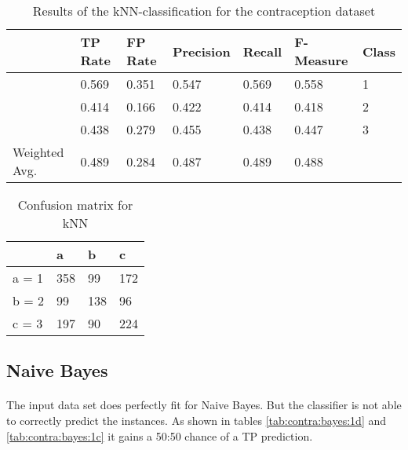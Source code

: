 \documentclass[paper=a4, fontsize=11pt]{scrartcl} %
\numberwithin{equation}{section} %
\numberwithin{figure}{section} %
\numberwithin{table}{section} %
\begin{document}
\begin{table}[h]
\centering
\begin{tabular}{lllllll}
	\toprule
	&								TP Rate   	&FP Rate   &Precision   &Recall  &F-Measure     	&Class\\
	\midrule
									&0.569     	&0.351     &0.547     	&0.569   &0.558      	     	&1\\
                 	&0.414     	&0.166     &0.422     	&0.414   &0.418      	    	&2\\
                 	&0.438     	&0.279     &0.455     	&0.438   &0.447      	    	&3\\

	Weighted Avg.   &0.489     	&0.284     &0.487     	&0.489   &0.488      				&\\
	\bottomrule
\end{tabular}
\caption{Results of the kNN-classification for the contraception dataset}
\end{table}

\vspace{6pt}

\begin{table}[h]
\centering
\begin{tabular}{|l|lll|}
	\hline
	      &a   &b   &c \\
	\hline
    a = 1 &358 &99  &172\\
    b = 2 &99  &138 &96 \\
 	c = 3 &197 &90  &224 \\
  \hline
\end{tabular}
\caption{Confusion matrix for kNN}
\end{table}


\subsection{Naive Bayes}

\paragraph{}The input data set does perfectly fit for Naive Bayes. But the classifier is not able to correctly predict the instances. As shown in tables \ref{tab:contra:bayes:1d} and \ref{tab:contra:bayes:1c} it gains a 50:50 chance of a TP prediction.
\end{document}
